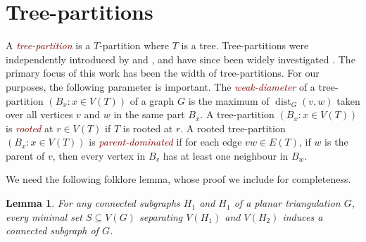 \documentclass[11pt]{article}
\newcommand{\defn}[1]{\textcolor{Maroon}{\emph{#1}}}
\DeclareMathOperator{\dist}{dist}
\DeclareMathOperator{\tpw}{tpw}
\theoremstyle{plain}
\newtheorem{lem}[thm]{Lemma}
\theoremstyle{definition}
\begin{document}
		
		\section{Tree-partitions}
		\label{sec:tree-partitions}
		
		A \defn{tree-partition} is a $T$-partition where $T$ is a tree. 
		Tree-partitions were independently introduced by \citet{Seese85} and \citet{Halin91}, and have since been widely investigated \citep{Bodlaender-DMTCS99,BodEng-JAlg97,DO95,DO96,Edenbrandt86,Wood06,DKCPS,Wood09,BGJ22,DS20,DW24}. The primary focus of this work has been the width of tree-partitions. For our purposes, the following parameter is important. The \defn{weak-diameter} of a tree-partition $(B_x:x\in V(T))$ of a graph $G$ is the maximum of $\dist_G(v,w)$ taken over all vertices $v$ and $w$ in the same part $B_x$. 
		A tree-partition $(B_x:x\in V(T))$ is \defn{rooted} at $r\in V(T)$ if $T$ is rooted at $r$. A rooted tree-partition $(B_x:x\in V(T))$ is \defn{parent-dominated} if for each edge $vw\in E(T)$, if $w$ is the parent of $v$, then every vertex in $B_v$ has at least one neighbour in $B_w$. 
		
        
		We need the following folklore lemma, whose proof we include for completeness. 
		
		\begin{lem}
			\label{TriangulationSeparator}
			For any connected subgraphs $H_1$ and $H_1$ of a planar triangulation $G$, every minimal set $S\subseteq V(G)$ separating $V(H_1)$ and $V(H_2)$ induces a connected subgraph of $G$.
		\end{lem}
		
\end{document}

